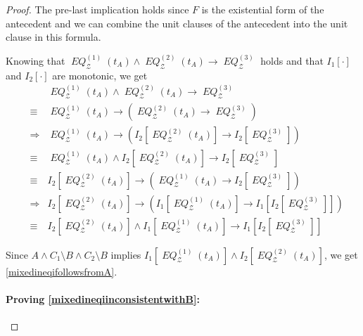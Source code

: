 \documentclass[a4paper]{article}
\theoremstyle{definition}
\newcommand\withoutB{\setminus B}
\newcommand\mZ{\mathcal{Z}}
\newcommand\meq{\mathop{\mathit{EQ}}\nolimits}
\newcommand\meqzone{\meq_\mZ^{(1)}}
\newcommand\meqztwo{\meq_\mZ^{(2)}}
\newcommand\meqzthree{\meq_\mZ^{(3)}}
\begin{document}
\begin{proof}
  The pre-last implication holds since $F$ is the existential form of the antecedent and we can combine the unit clauses of the antecedent into the unit clause in this formula.

  Knowing that $\meqzone(t_A)\wedge\meqztwo(t_A)\rightarrow\meqzthree$ holds and that $I_1[\cdot]$ and $I_2[\cdot]$ are monotonic, we get
  \begin{eqnarray*}
    &&\meqzone(t_A)\wedge\meqztwo(t_A)\rightarrow\meqzthree\\
    &\equiv&\meqzone(t_A)\rightarrow(\meqztwo(t_A)\rightarrow\meqzthree)\\
    &\Rightarrow&\meqzone(t_A)\rightarrow(I_2[\meqztwo(t_A)]\rightarrow I_2[\meqzthree])\\
    &\equiv&\meqzone(t_A)\wedge I_2[\meqztwo(t_A)]\rightarrow I_2[\meqzthree]\\
    &\equiv&I_2[\meqztwo(t_A)]\rightarrow(\meqzone(t_A)\rightarrow I_2[\meqzthree])\\
    &\Rightarrow&I_2[\meqztwo(t_A)]\rightarrow(I_1[\meqzone(t_A)]\rightarrow I_1[I_2[\meqzthree]])\\
    &\equiv&I_2[\meqztwo(t_A)]\wedge I_1[\meqzone(t_A)]\rightarrow I_1[I_2[\meqzthree]]
  \end{eqnarray*}

  Since $A\wedge C_1\withoutB\wedge C_2\withoutB$ implies $I_1[\meqzone(t_A)]\wedge I_2[\meqztwo(t_A)]$, we get \ref{mixedineqifollowsfromA}.
  \paragraph{Proving \ref{mixedineqiinconsistentwithB}:}
\end{proof}
\end{document}
